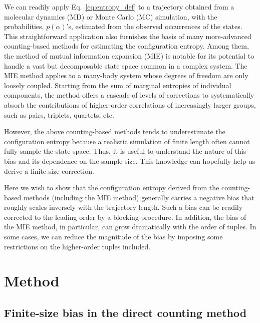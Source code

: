 \documentclass[reprint, superscriptaddress]{revtex4-1}
\begin{document}
We can readily apply Eq.~\eqref{eq:entropy_def} to a trajectory
obtained from a molecular dynamics (MD) or Monte Carlo (MC) simulation,
with the probabilities, $p(\alpha)$'s,
estimated from the observed occurrences of the states.
%
This straightforward application also furnishes the basis
of many more-advanced counting-based methods for estimating the configuration entropy\cite{hnizdo2007, killian2007}.
%
Among them, the method of mutual information expansion (MIE)\cite{killian2007} is notable
for its potential to handle a vast but decomposable state space common in a complex system.
%
The MIE method applies to a many-body system
whose degrees of freedom are only loosely coupled.
%
Starting from the sum of marginal entropies of individual components,
the method offers a cascade of levels of corrections
to systematically absorb the contributions of higher-order correlations
of increasingly larger groups, such as pairs, triplets, quartets, etc.

However, the above counting-based methods
tends to underestimate the configuration entropy
because a realistic simulation of finite length
often cannot fully sample the state space.
%
Thus, it is useful to understand the nature of this bias
and its dependence on the sample size.
%
This knowledge can hopefully help us derive a finite-size correction.

Here we wish to show that the configuration entropy derived
from the counting-based methods (including the MIE method)
generally carries a negative bias
that roughly scales inversely with the trajectory length.
%
Such a bias can be readily corrected to the leading order
by a blocking procedure.
%
In addition, the bias of the MIE method, in particular,
can grow dramatically with the order of tuples.
%
In some cases, we can reduce the magnitude of the bias
by imposing some restrictions on the higher-order tuples included.



\section{Method}

\subsection{\label{sec:fsbias}
Finite-size bias in the direct counting method}
\end{document}
